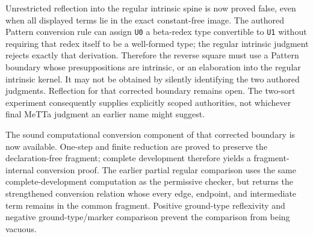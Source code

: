\documentclass[11pt]{article}
\newcommand{\code}[1]{\texttt{#1}}
\begin{document}
Unrestricted reflection into the regular intrinsic spine is now proved false,
even when all displayed terms lie in the exact constant-free image.  The authored
Pattern conversion rule can assign \code{U0} a beta-redex type convertible to
\code{U1} without requiring that redex itself to be a well-formed type; the
regular intrinsic judgment rejects exactly that derivation.  Therefore the
reverse square must use a Pattern boundary whose presuppositions are intrinsic,
or an elaboration into the regular intrinsic kernel.  It may not be obtained by
silently identifying the two authored judgments.  Reflection for that corrected
boundary remains open.
The two-sort experiment consequently supplies explicitly scoped authorities,
not whichever final MeTTa judgment an earlier name might suggest.

The sound computational conversion component of that corrected boundary is now
available.  One-step and finite reduction are proved to preserve the
declaration-free fragment; complete development therefore yields a
fragment-internal conversion proof. The earlier partial regular comparison uses
the same complete-development computation as the permissive checker, but returns the
strengthened conversion relation whose every edge, endpoint, and intermediate
term remains in the common fragment. Positive ground-type reflexivity and
negative ground-type/marker comparison prevent the comparison from being vacuous.
\end{document}

